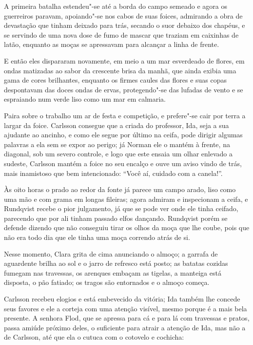 A primeira batalha estendeu"-se até a borda do campo semeado e agora os
guerreiros paravam, apoiando"-se nos cabos de suas foices, admirando a obra de
devastação que tinham deixado para trás, secando o suor debaixo dos chapéus, e
se servindo de uma nova dose de fumo de mascar que traziam em caixinhas de
latão, enquanto as moças se apressavam para alcançar a linha de frente.

E então eles dispararam novamente, em meio a um mar esverdeado de flores, em ondas
matizadas ao sabor da crescente brisa da manhã, que ainda exibia uma gama de
cores brilhantes, enquanto os firmes caules das flores e suas copas despontavam
das doces ondas de ervas, protegendo"-se das lufadas de vento e se espraiando num
verde liso como um mar em calmaria.

Paira sobre o trabalho um ar de festa e competição, e prefere"-se cair por
terra a largar da foice. Carlsson consegue que a criada do professor, Ida,
seja a sua ajudante ao ancinho, e como ele segue por último na ceifa, pode 
dirigir algumas palavras a ela sem se expor ao perigo; já Norman ele o
mantém à frente, na diagonal, sob um severo controle, e logo que este ensaia
um olhar enlevado a sudeste, Carlsson mantém a foice no seu encalço e
ouve um aviso vindo de trás, mais inamistoso que bem intencionado: ``Você aí,
cuidado com a canela!''.

Às oito horas o prado ao redor da fonte já parece um campo arado, liso como uma
mão e com grama em longas fileiras; agora admiram e inspecionam a ceifa, e
Rundqvist recebe o pior julgamento, já que se pode ver onde ele tinha ceifado, 
parecendo que por ali tinham passado elfos dançando. Rundqvist porém se 
defende dizendo que não conseguiu tirar os olhos da moça que lhe coube, 
pois que não era todo dia que ele tinha uma moça correndo atrás de si. 

Nesse momento, Clara grita de cima anunciando o almoço; a garrafa de aguardente brilha
ao sol e o jarro de refresco está posto; as batatas cozidas fumegam nas
travessas, os arenques embaçam as tigelas, a manteiga está disposta, o pão
fatiado; os tragos são entornados e o almoço começa.

Carlsson recebeu elogios e está embevecido da vitória; Ida também lhe concede
seus favores e ele a corteja com uma atenção visível, mesmo porque é a mais
bela presente. A senhora Flod, que se apressa para cá e para lá com travessas e
pratos, passa amiúde próximo deles, o suficiente para atrair a atenção de Ida,
mas não a de Carlsson, até que ela o cutuca com o cotovelo e cochicha:

